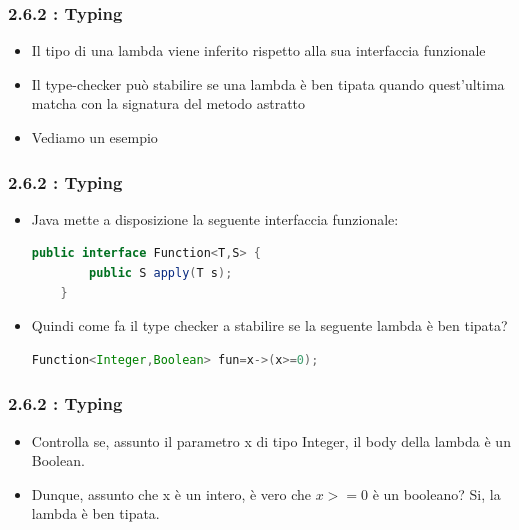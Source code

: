 \documentclass{beamer}
\begin{document}

\begin{frame}
\frametitle{\textbf{2.6.2 : Typing}}
\begin{itemize}
	\item Il tipo di una lambda viene inferito rispetto alla sua interfaccia funzionale
	\item Il type-checker pu\`o stabilire se una lambda \`e ben tipata quando quest'ultima matcha con la signatura del metodo astratto
	\item Vediamo un esempio
\end{itemize}
\end{frame}


\begin{frame}[fragile]
\frametitle{\textbf{2.6.2 : Typing}}
\begin{itemize}
	\item Java mette a disposizione la seguente interfaccia funzionale:
	\begin{lstlisting}[language=Java]
	public interface Function<T,S> {
		public S apply(T s);
	}
	\end{lstlisting}
	\item Quindi come fa il type checker a stabilire se la seguente lambda è ben tipata?
	\begin{lstlisting}[language=Java]
	Function<Integer,Boolean> fun=x->(x>=0);
	\end{lstlisting}
\end{itemize}
\end{frame}


\begin{frame}[fragile]
\frametitle{\textbf{2.6.2 : Typing}}
\begin{itemize}
	\item Controlla se, assunto il parametro x di tipo Integer, il body della lambda è un Boolean.
	\item Dunque, assunto che x è un intero, è vero che $x>=0$ è un booleano? Si, la lambda è ben tipata.
\end{itemize}
\end{frame}

\end{document}
